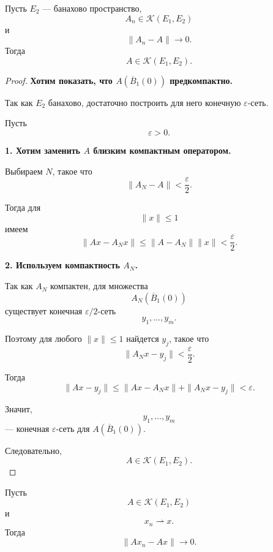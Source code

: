 \begin{theorem}
	Пусть \(E_2\) --- банахово пространство,
	\[
	A_n\in\mathcal K(E_1,E_2)
	\]
	и
	\[
	\|A_n-A\|\to0.
	\]
	Тогда
	\[
	A\in\mathcal K(E_1,E_2).
	\]
\end{theorem}

\begin{proof}
	\textbf{Хотим показать, что \(A(\overline B_1(0))\) предкомпактно.}
	
	Так как \(E_2\) банахово, достаточно построить для него конечную
	\(\varepsilon\)-сеть.
	
	Пусть
	\[
	\varepsilon>0.
	\]
	
	\textbf{1. Хотим заменить \(A\) близким компактным оператором.}
	
	Выбираем \(N\), такое что
	\[
	\|A_N-A\|<\frac{\varepsilon}{2}.
	\]
	
	Тогда для
	\[
	\|x\|\leq1
	\]
	имеем
	\[
	\|Ax-A_Nx\|
	\leq
	\|A-A_N\|\|x\|
	<
	\frac{\varepsilon}{2}.
	\]
	
	\textbf{2. Используем компактность \(A_N\).}
	
	Так как \(A_N\) компактен, для множества
	\[
	A_N(\overline B_1(0))
	\]
	существует конечная \(\varepsilon/2\)-сеть
	\[
	y_1,\ldots,y_m.
	\]
	
	Поэтому для любого \(\|x\|\leq1\) найдется \(y_j\), такое что
	\[
	\|A_Nx-y_j\|<\frac{\varepsilon}{2}.
	\]
	
	Тогда
	\[
	\|Ax-y_j\|
	\leq
	\|Ax-A_Nx\|+\|A_Nx-y_j\|
	<
	\varepsilon.
	\]
	
	Значит,
	\[
	y_1,\ldots,y_m
	\]
	--- конечная \(\varepsilon\)-сеть для \(A(\overline B_1(0))\).
	
	Следовательно,
	\[
	A\in\mathcal K(E_1,E_2).
	\]
\end{proof}

\begin{theorem}
	Пусть
	\[
	A\in\mathcal K(E_1,E_2)
	\]
	и
	\[
	x_n\rightharpoonup x.
	\]
	Тогда
	\[
	\|Ax_n-Ax\|\to0.
	\]
\end{theorem}


